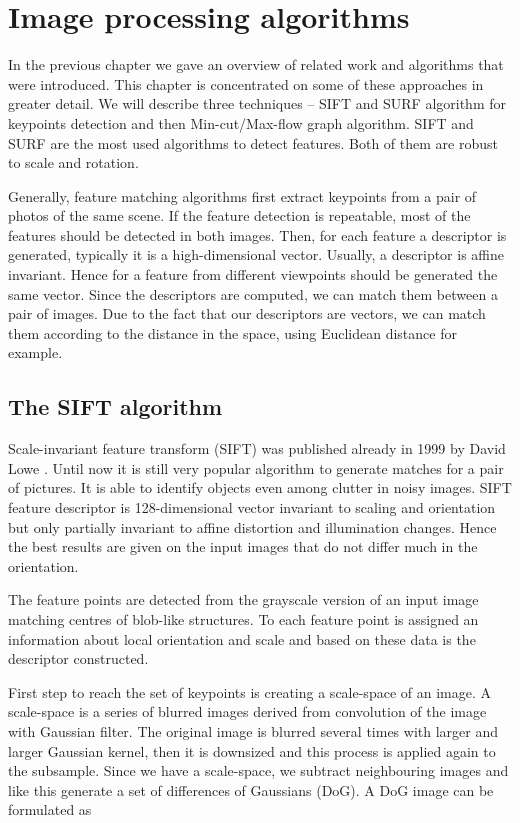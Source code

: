\chapter{Image processing algorithms}
In the previous chapter we gave an overview of related work and algorithms that were introduced. 
This chapter is concentrated on some of these approaches in greater detail. 
We will describe three techniques -- SIFT and SURF algorithm for keypoints detection and then Min-cut/Max-flow graph algorithm.
SIFT and SURF are the most used algorithms to detect features.
Both of them are robust to scale and rotation.


 Generally, feature matching algorithms first extract keypoints from a pair of photos of the same scene. 
 If the feature detection is repeatable, most of the features should be detected in both images.
 Then, for each feature a descriptor is generated, typically it is a high-dimensional vector. 
 Usually, a descriptor is affine invariant.
 Hence for a feature from different viewpoints should be generated the same vector.
 Since the descriptors are computed,  we can match them between a pair of images. 
 Due to the fact that our descriptors are vectors, we can match them according to the distance in the space, using Euclidean distance for example.
 
\section{The SIFT algorithm}
Scale-invariant feature transform (SIFT) was published already in 1999 by David Lowe \cite{lowe1999}. 
Until now it is still very popular algorithm to generate matches for a pair of pictures.
It is able to identify objects even among clutter in noisy images.
SIFT feature descriptor is 128-dimensional vector invariant to scaling and orientation but only partially invariant to affine distortion and illumination changes.
Hence the best results are given on the input images that do not differ much in the orientation.

The feature points are detected from the grayscale version of an input image matching centres of blob-like structures.
To each feature point is assigned an information about local orientation and scale and based on these data is the descriptor constructed.

First step to reach the set of keypoints is creating a scale-space of an image.
A scale-space is a series of blurred images derived from convolution of the image with Gaussian filter.
The original image is blurred several times with larger and larger Gaussian kernel, then it is downsized and this process is applied again to the subsample.
Since we have a scale-space, we subtract neighbouring images and like this generate a set of differences of Gaussians (DoG). 
A DoG image can be formulated as
 
